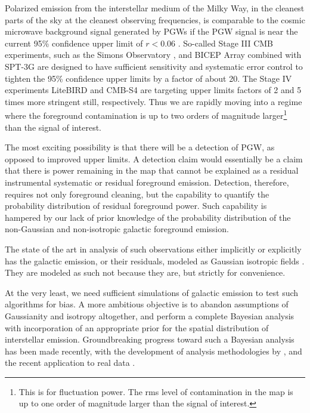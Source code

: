 \documentclass[fleqn,usenatbib]{mnras}
\begin{document}
    Polarized emission from the interstellar medium of the Milky Way, in the cleanest parts of the sky at the cleanest observing frequencies, is comparable to the cosmic microwave background signal generated by PGWs if the PGW signal is near the current 95\% confidence upper limit of $r < 0.06$ \citep{bkp/constraints:2018}. So-called Stage III CMB experiments, such as the Simons Observatory \citep{sogoals:2019}, and BICEP Array \citep{hui/etal:2018} combined with SPT-3G \citep{benson/etal:2014} are designed to have sufficient sensitivity and systematic error control to tighten the 95\% confidence upper limits by a factor of about 20. The Stage IV experiments LiteBIRD and CMB-S4 are targeting upper limits factors of 2 and 5 times more stringent still, respectively. Thus we are rapidly moving into a regime where the foreground contamination is up to two orders of magnitude larger\footnote{This is for fluctuation power. The rms level of contamination in the map is up to one order of magnitude larger than the signal of interest.} than the signal of interest. 

The most exciting possibility is that there will be a detection of PGW, as opposed to improved upper limits. A detection claim would essentially be a claim that there is power remaining in the map that cannot be explained as a residual instrumental systematic or residual foreground emission. Detection, therefore, requires not only foreground cleaning, but the capability to quantify the probability distribution of residual foreground power. Such capability is hampered by our lack of prior knowledge of the probability distribution of the non-Gaussian and non-isotropic galactic foreground emission. 

The state of the art in analysis of such observations either implicitly or explicitly has the galactic emission, or their residuals, modeled as Gaussian isotropic fields \citep{planck/parameters:2018,aiola/etal:2020,bkp/constraints:2018}. They are modeled as such not because they are, but strictly for convenience. 

At the very least, we need sufficient simulations of galactic emission to test such algorithms for bias. 
A more ambitious objective is to abandon assumptions of Gaussianity and isotropy altogether, and perform a complete Bayesian analysis with incorporation of an appropriate prior for the spatial distribution of interstellar emission. Groundbreaking progress toward such a Bayesian analysis has been made recently, with the development of analysis methodologies by \cite{millea20a}, and the recent application to real data \citep{millea20b}. 
\end{document}
